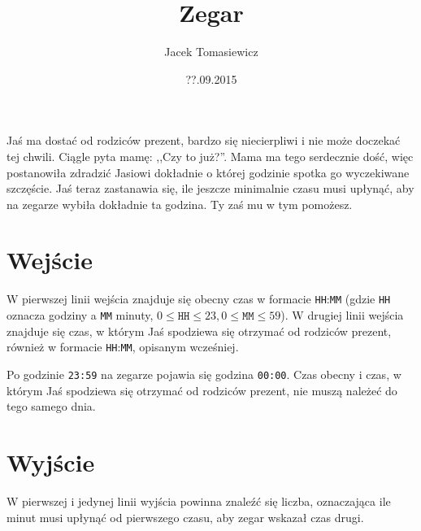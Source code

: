 \documentclass[zad,zawodnik,utf8]{sinol}
\title{Zegar}
\author{Jacek Tomasiewicz} %
\date{??.09.2015}
\begin{document}
\begin{tasktext}%
Jaś ma dostać od rodziców prezent, bardzo się niecierpliwi i nie może doczekać tej chwili. Ciągle pyta mamę: ,,Czy to już?''. Mama ma tego serdecznie dość, więc postanowiła zdradzić Jasiowi dokładnie o której godzinie spotka go wyczekiwane szczęście. Jaś teraz zastanawia się, ile jeszcze minimalnie czasu musi upłynąć, aby na zegarze wybiła dokładnie ta godzina. Ty zaś mu w tym pomożesz.

  \section{Wejście}
W pierwszej linii wejścia znajduje się obecny czas w formacie \texttt{HH}:\texttt{MM} (gdzie \texttt{HH} oznacza godziny a \texttt{MM} minuty, $0 \leq \texttt{HH} \leq 23, 0 \leq \texttt{MM}
\leq 59$). W drugiej linii wejścia znajduje się czas, w którym Jaś spodziewa się otrzymać od rodziców prezent, również w formacie \texttt{HH}:\texttt{MM}, opisanym wcześniej.

Po godzinie \texttt{23:59} na zegarze pojawia się godzina \texttt{00:00}. Czas obecny i czas, w którym Jaś spodziewa się otrzymać od rodziców prezent, nie muszą należeć do tego samego dnia. 

  \section{Wyjście}
W pierwszej i jedynej linii wyjścia powinna znaleźć się liczba, oznaczająca ile minut musi upłynąć od pierwszego czasu, aby zegar wskazał czas drugi.

\makecompactexample

\end{tasktext}
\end{document}
